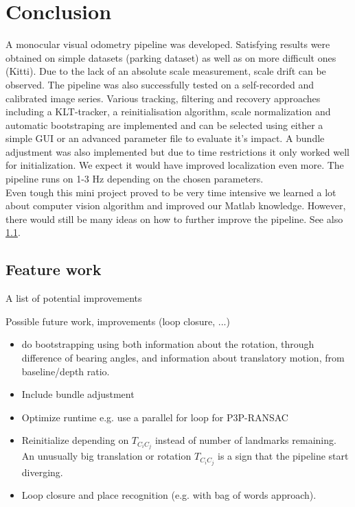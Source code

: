 \section{Conclusion}
A monocular visual odometry pipeline was developed. Satisfying results were obtained on simple datasets (parking dataset) as well as on more difficult ones (Kitti). Due to the lack of an absolute scale measurement, scale drift can be observed. The pipeline was also successfully tested on a self-recorded and calibrated image series. Various tracking, filtering and recovery approaches including a KLT-tracker, a reinitialisation algorithm, scale normalization and automatic bootstraping are implemented and can be selected using either a simple GUI or an advanced parameter file to evaluate it's impact. A bundle adjustment was also implemented but due to time restrictions it only worked well for initialization. We expect it would have improved localization even more. The pipeline runs on 1-3 Hz depending on the chosen parameters.\\

Even tough this mini project proved to be very time intensive we learned a lot about computer vision algorithm and improved our Matlab knowledge. However, there would still be many ideas on how to further improve the pipeline. See also \cref{future}.

\subsection{Feature work}\label{future}
A list of potential improvements

Possible future work, improvements (loop closure, ...)

\begin{itemize}
\item do bootstrapping using both information about the rotation, through difference of bearing angles, and information about translatory motion, from baseline/depth ratio.
\item Include bundle adjustment
\item Optimize runtime e.g. use a parallel for loop for P3P-RANSAC
\item Reinitialize depending on $T_{C_iC_j}$ instead of number of landmarks remaining. An unusually big translation or rotation $T_{C_iC_j}$ is a sign that the pipeline start diverging.
\item Loop closure and place recognition (e.g. with bag of words approach).
\end{itemize}